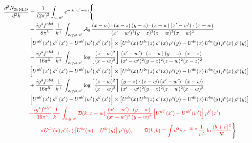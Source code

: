 \documentclass[9pt]{article}
\numberwithin{equation}{section}
\newcommand{\chg}[1]{{\color{red}#1}}
\begin{document}
\begin{align}
\frac{d^{3}N_{3b\,\rm NLO}}{d^{3}k} & = \frac{1}{(2\pi)^{3}}\int_{w,w'}e^{-ik(w'-w)}\Bigg\{\notag \\
&-\frac{ig^{4}f^{abd}}{8\pi^{5}}\,\frac{1}{k^{+}}\,\int_{x,y,z,x'}\mathcal{A}_{0}\,
\frac{(x-w)\cdot(x-z)\,(y-z)\cdot(z-w)\,(x'-w')\cdot(x-w)}{(x'-w')^{2}(y-z)^{2}(z-w)^{2}(x-w)^{2}}\notag \\ & \left[U^{ab'}(x')\,\rho^{b'}(x')-U^{ab'}(w')\, \rho^{b'}(x')\right]\times \left[U^{de}(x)\,U^{bc}(z)\, \rho^{e}(x)\,\rho^{c}(y)-U^{de}(x)\,U^{bc}(y)\,\rho^{e}(x)\,\rho^{c}(y)\right] \notag \\
& -\frac{ig^{4}f^{abd}}{16\pi^{5}}\,\frac{1}{k^{+}}\,\int_{x,y,z,x'}\log{\left[\frac{(z-w)^{2}}{(x-w)^{2}}\right]}\,
\frac{(x'-w')\cdot(z-w)\,(y-z)\cdot(x-z)}{(x'-w')^{2}(y-z)^{2}(z-w)^{2}(x-z)^{2}}\notag \\
&\left[U^{ab'}(x')\,\rho^{b'}(x')-U^{ab'}(w')\, \rho^{b'}(x')\right]\times \left[U^{de}(x)\,U^{bc}(z)\, \rho^{e}(x)\,\rho^{c}(y)-U^{de}(x)\,U^{bc}(y)\,\rho^{e}(x)\,\rho^{c}(y)\right] \notag \\
&+ \frac{ig^{4}f^{abd}}{16\pi^{5}}\,\frac{1}{k^{+}}\,\int_{x,y,z,x'}\log{\left[\frac{(z-w)^{2}}{(x-w)^{2}}\right]}\,
\frac{(y-z)\cdot(z-w)\,(x'-w')\cdot(x-w)}{(x'-w')^{2}(y-z)^{2}(z-w)^{2}(x-w)^{2}}\notag \\ 
& \left[U^{ab'}(x')\,\rho^{b'}(x')-U^{ab'}(w')\, \rho^{b'}(x')\right]\times \left[U^{de}(x)\,U^{bc}(z)\, \rho^{e}(x)\,\rho^{c}(y)-U^{de}(x)\,U^{bc}(y)\,\rho^{e}(x)\,\rho^{c}(y)\right]\notag \\ & \chg{+\frac{ig^{4}f^{abd}}{16\pi^{5}}\,\frac{1}{k^{+}}\,\int_{x,y,x'}\mathcal{D}(k,x-w)\,\frac{(x'-w')\cdot(y-w)}{(x'-w')^{2}\,(y-w)^{2}}\left[U^{ab'}(x')-U^{ab'}(w')\right]\rho^{b'}(x')}\notag \\ & \chg{\qquad\times U^{de}(x)\,\rho^{e}(x)\left[U^{bc}(w)-U^{bc}(y)\right]\rho^{c}(y),\qquad \mathcal{D}(k,b)\equiv\int d^{2}v\;e^{-ik\cdot v}\,\frac{1}{v^{2}}\,\ln\frac{(b+v)^{2}}{b^{2}}}\Bigg\}
\end{align}
\end{document}
